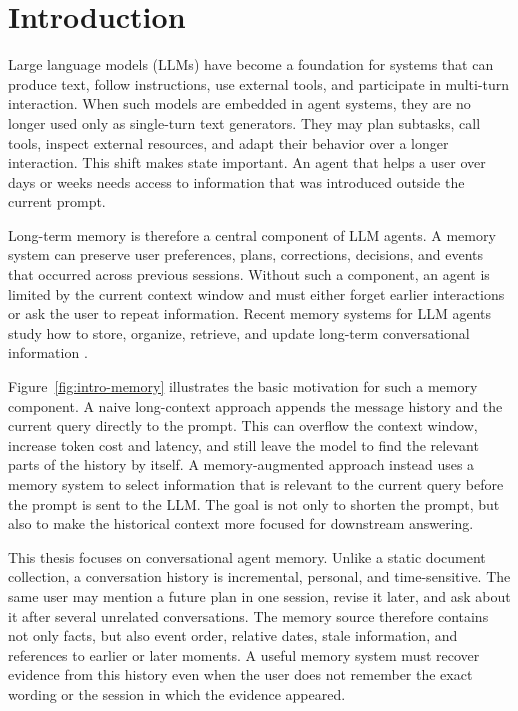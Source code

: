 \chapter{Introduction}
\label{chap:introduction}

Large language models (LLMs) have become a foundation for systems that can
produce text, follow instructions, use external tools, and participate in
multi-turn interaction. When such models are embedded in agent systems, they are
no longer used only as single-turn text generators. They may plan subtasks, call
tools, inspect external resources, and adapt their behavior over a longer
interaction. This shift makes state important. An agent that helps a user over
days or weeks needs access to information that was introduced outside the
current prompt.

Long-term memory is therefore a central component of LLM agents. A memory
system can preserve user preferences, plans, corrections, decisions, and events
that occurred across previous sessions. Without such a component, an agent is
limited by the current context window and must either forget earlier
interactions or ask the user to repeat information. Recent memory systems for
LLM agents study how to store, organize, retrieve, and update long-term
conversational information
\cite{chhikara2025mem0,li2025memos,xu2025amem,zhang2025gmemory,zhang2025memsim}.

Figure~\ref{fig:intro-memory} illustrates the basic motivation for such a
memory component. A naive long-context approach appends the message history and
the current query directly to the prompt. This can overflow the context window,
increase token cost and latency, and still leave the model to find the relevant
parts of the history by itself. A memory-augmented approach instead uses a
memory system to select information that is relevant to the current query
before the prompt is sent to the LLM. The goal is not only to shorten the
prompt, but also to make the historical context more focused for downstream
answering.

This thesis focuses on conversational agent memory. Unlike a static document
collection, a conversation history is incremental, personal, and time-sensitive.
The same user may mention a future plan in one session, revise it later, and
ask about it after several unrelated conversations. The memory source therefore
contains not only facts, but also event order, relative dates, stale
information, and references to earlier or later moments. A useful memory system
must recover evidence from this history even when the user does not remember the
exact wording or the session in which the evidence appeared.


